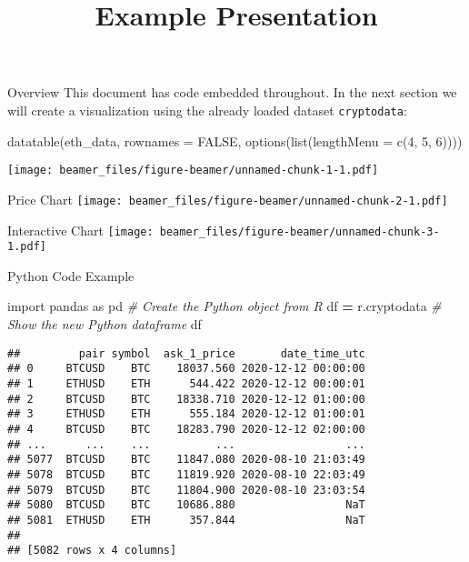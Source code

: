 \documentclass[
  ignorenonframetext,
]{beamer}
\title{Example Presentation}
\author{}
\date{\vspace{-2.5em}}
\newenvironment{Shaded}{\begin{snugshade}}{\end{snugshade}}
\newcommand{\AttributeTok}[1]{\textcolor[rgb]{0.77,0.63,0.00}{#1}}
\newcommand{\CommentTok}[1]{\textcolor[rgb]{0.56,0.35,0.01}{\textit{#1}}}
\newcommand{\ConstantTok}[1]{\textcolor[rgb]{0.00,0.00,0.00}{#1}}
\newcommand{\DecValTok}[1]{\textcolor[rgb]{0.00,0.00,0.81}{#1}}
\newcommand{\FunctionTok}[1]{\textcolor[rgb]{0.00,0.00,0.00}{#1}}
\newcommand{\ImportTok}[1]{#1}
\newcommand{\NormalTok}[1]{#1}
\newcommand{\OperatorTok}[1]{\textcolor[rgb]{0.81,0.36,0.00}{\textbf{#1}}}
\begin{document}
\frame{\titlepage}

\begin{frame}[fragile]{Overview}
\protect\hypertarget{overview}{}
This document has code embedded throughout. In the next section we will
create a visualization using the already loaded dataset
\texttt{cryptodata}:

\begin{Shaded}
\begin{Highlighting}[]
\FunctionTok{datatable}\NormalTok{(eth\_data, }\AttributeTok{rownames =} \ConstantTok{FALSE}\NormalTok{, }
          \FunctionTok{options}\NormalTok{(}\FunctionTok{list}\NormalTok{(}\AttributeTok{lengthMenu =} \FunctionTok{c}\NormalTok{(}\DecValTok{4}\NormalTok{, }\DecValTok{5}\NormalTok{, }\DecValTok{6}\NormalTok{))))}
\end{Highlighting}
\end{Shaded}

\texttt{[image: beamer\_files/figure-beamer/unnamed-chunk-1-1.pdf]}
\end{frame}

\begin{frame}{Price Chart}
\protect\hypertarget{price-chart}{}
\texttt{[image: beamer\_files/figure-beamer/unnamed-chunk-2-1.pdf]}
\end{frame}

\begin{frame}{Interactive Chart}
\protect\hypertarget{interactive-chart}{}
\texttt{[image: beamer\_files/figure-beamer/unnamed-chunk-3-1.pdf]}
\end{frame}

\begin{frame}[fragile]{Python Code Example}
\protect\hypertarget{python-code-example}{}
\begin{Shaded}
\begin{Highlighting}[]
\ImportTok{import}\NormalTok{ pandas }\ImportTok{as}\NormalTok{ pd}
\CommentTok{\# Create the Python object from R}
\NormalTok{df }\OperatorTok{=}\NormalTok{ r.cryptodata}
\CommentTok{\# Show the new Python dataframe}
\NormalTok{df}
\end{Highlighting}
\end{Shaded}

\begin{verbatim}
##         pair symbol  ask_1_price       date_time_utc
## 0     BTCUSD    BTC    18037.560 2020-12-12 00:00:00
## 1     ETHUSD    ETH      544.422 2020-12-12 00:00:01
## 2     BTCUSD    BTC    18338.710 2020-12-12 01:00:00
## 3     ETHUSD    ETH      555.184 2020-12-12 01:00:01
## 4     BTCUSD    BTC    18283.790 2020-12-12 02:00:00
## ...      ...    ...          ...                 ...
## 5077  BTCUSD    BTC    11847.080 2020-08-10 21:03:49
## 5078  BTCUSD    BTC    11819.920 2020-08-10 22:03:49
## 5079  BTCUSD    BTC    11804.900 2020-08-10 23:03:54
## 5080  BTCUSD    BTC    10686.880                 NaT
## 5081  ETHUSD    ETH      357.844                 NaT
## 
## [5082 rows x 4 columns]
\end{verbatim}
\end{frame}
\end{document}
